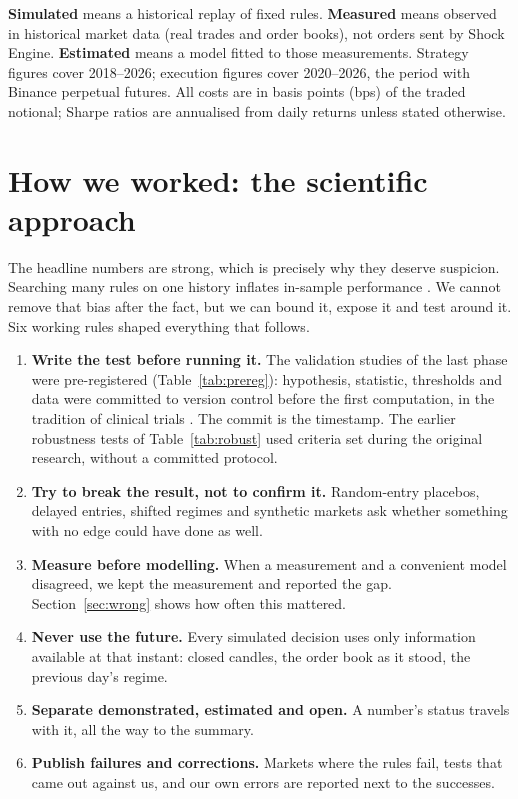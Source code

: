 \documentclass[11pt,a4paper]{article}
\newcommand{\question}[1]{\par\vspace{-2pt}{\sffamily\itshape\color{accent}#1}\par\vspace{6pt}}
\begin{document}
\begin{keybox}
\textbf{Simulated} means a historical replay of fixed rules. \textbf{Measured} means observed in historical market data (real
trades and order books), not orders sent by Shock Engine. \textbf{Estimated} means a model fitted to those measurements.
Strategy figures cover 2018--2026; execution figures cover 2020--2026, the period with Binance perpetual futures. All costs are
in basis points (bps) of the traded notional; Sharpe ratios are annualised from daily returns unless stated otherwise.
\end{keybox}

\newpage
\section{How we worked: the scientific approach}\label{sec:method}
\question{``Why should I believe any of this?''}

The headline numbers are strong, which is precisely why they deserve suspicion. Searching many rules on one history inflates
in-sample performance \citep{white2000,bailey2014,harvey2016}. We cannot remove that bias after the fact, but we can bound it,
expose it and test around it. Six working rules shaped everything that follows.

\begin{enumerate}[label={\sffamily\bfseries\color{accent}\arabic*.},leftmargin=1.6em]
\item \textbf{Write the test before running it.} The validation studies of the last phase were pre-registered (Table~\ref{tab:prereg}):
  hypothesis, statistic, thresholds and data were committed to version control before the first computation, in the tradition
  of clinical trials \citep{nosek2018}. The commit is the timestamp. The earlier robustness tests of Table~\ref{tab:robust} used
  criteria set during the original research, without a committed protocol.
\item \textbf{Try to break the result, not to confirm it.} Random-entry placebos, delayed entries, shifted regimes and
  synthetic markets ask whether something with no edge could have done as well.
\item \textbf{Measure before modelling.} When a measurement and a convenient model disagreed, we kept the measurement and
  reported the gap. Section~\ref{sec:wrong} shows how often this mattered.
\item \textbf{Never use the future.} Every simulated decision uses only information available at that instant: closed
  candles, the order book as it stood, the previous day's regime.
\item \textbf{Separate demonstrated, estimated and open.} A number's status travels with it, all the way to the summary.
\item \textbf{Publish failures and corrections.} Markets where the rules fail, tests that came out against us, and our own
  errors are reported next to the successes.
\end{enumerate}
\end{document}

